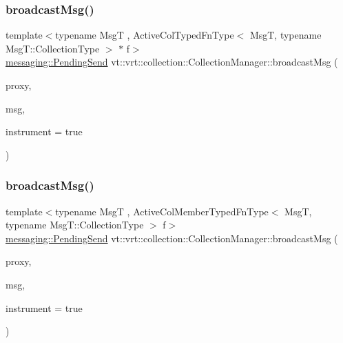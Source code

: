 \subsubsection{\texorpdfstring{broadcast\+Msg()}{broadcastMsg()}\hspace{0.1cm}{\footnotesize\ttfamily [1/6]}}
{\footnotesize\ttfamily template$<$typename MsgT , Active\+Col\+Typed\+Fn\+Type$<$ Msg\+T, typename Msg\+T\+::\+Collection\+Type $>$ $\ast$ f$>$ \\
\hyperlink{structvt_1_1messaging_1_1_pending_send}{messaging\+::\+Pending\+Send} vt\+::vrt\+::collection\+::\+Collection\+Manager\+::broadcast\+Msg (\begin{DoxyParamCaption}\item[{\hyperlink{structvt_1_1vrt_1_1collection_1_1_collection_manager_a56458ed7f9bb22b631b9b3a745f42f94}{Collection\+Proxy\+Wrap\+Type}$<$ typename Msg\+T\+::\+Collection\+Type $>$ const \&}]{proxy,  }\item[{MsgT $\ast$}]{msg,  }\item[{bool}]{instrument = {\ttfamily true} }\end{DoxyParamCaption})}

\mbox{\label{structvt_1_1vrt_1_1collection_1_1_collection_manager_a9cadcebd1d7c26512091f9624a23a02c}} 
\subsubsection{\texorpdfstring{broadcast\+Msg()}{broadcastMsg()}\hspace{0.1cm}{\footnotesize\ttfamily [2/6]}}
{\footnotesize\ttfamily template$<$typename MsgT , Active\+Col\+Member\+Typed\+Fn\+Type$<$ Msg\+T, typename Msg\+T\+::\+Collection\+Type $>$ f$>$ \\
\hyperlink{structvt_1_1messaging_1_1_pending_send}{messaging\+::\+Pending\+Send} vt\+::vrt\+::collection\+::\+Collection\+Manager\+::broadcast\+Msg (\begin{DoxyParamCaption}\item[{\hyperlink{structvt_1_1vrt_1_1collection_1_1_collection_manager_a56458ed7f9bb22b631b9b3a745f42f94}{Collection\+Proxy\+Wrap\+Type}$<$ typename Msg\+T\+::\+Collection\+Type $>$ const \&}]{proxy,  }\item[{MsgT $\ast$}]{msg,  }\item[{bool}]{instrument = {\ttfamily true} }\end{DoxyParamCaption})}


